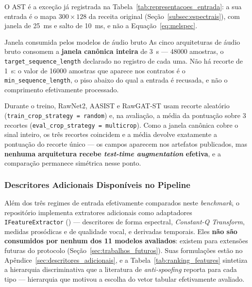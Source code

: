 \documentclass[12pt,a4paper]{article}
\begin{document}
O AST é a exceção já registrada na Tabela~\ref{tab:representacoes_entrada}: a
sua entrada é o mapa $300 \times 128$ da receita original
(Seção~\ref{subsec:espectrais}), com janela de \SI{25}{\milli\second} e salto
de \SI{10}{\milli\second}, e não a Equação~\ref{eq:melspec}.

\begin{infobox}{Janela consumida pelos modelos de áudio bruto}
	As cinco arquiteturas de áudio bruto consomem a \textbf{janela canônica
		inteira} de \SI{3}{\second} --- \num{48000} amostras, o
	\texttt{target\_sequence\_length} declarado no registro de cada uma. Não há
	recorte de \SI{1}{\second}: o valor de \num{16000} amostras que aparece nos
	contratos é o \texttt{min\_sequence\_length}, o piso abaixo do qual a entrada é
	recusada, e não o comprimento efetivamente processado.
	
	Durante o treino, RawNet2, AASIST e RawGAT-ST usam recorte aleatório
	(\texttt{train\_crop\_strategy = random}) e, na avaliação, a média da pontuação
	sobre \num{3} recortes (\texttt{eval\_crop\_strategy = multicrop}). Como a
	janela canônica cobre o sinal inteiro, os três recortes coincidem e a média
	devolve exatamente a pontuação do recorte único --- os campos aparecem nos
	artefatos publicados, mas \textbf{nenhuma arquitetura recebe
		\textit{test-time augmentation} efetiva}, e a comparação permanece simétrica
	nesse ponto.
\end{infobox}

\subsubsection*{Descritores Adicionais Disponíveis no Pipeline}

Além dos três regimes de entrada efetivamente comparados neste
\textit{benchmark}, o repositório implementa extratores adicionais como
adaptadores \texttt{IFeatureExtractor}
() --- descritores de forma
espectral, \textit{Constant-Q Transform}, medidas prosódicas e de qualidade
vocal, e derivadas temporais. Eles \textbf{não são consumidos por nenhum
	dos \num{11} modelos avaliados}: existem para extensões futuras do
protocolo (Seção~\ref{sec:trabalhos_futuros}). Suas formulações estão no
Apêndice~\ref{sec:descritores_adicionais}, e a
Tabela~\ref{tab:ranking_features} sintetiza a hierarquia discriminativa
que a literatura de \textit{anti-spoofing} reporta para cada tipo ---
hierarquia que motivou a escolha do vetor tabular efetivamente avaliado.
\end{document}

